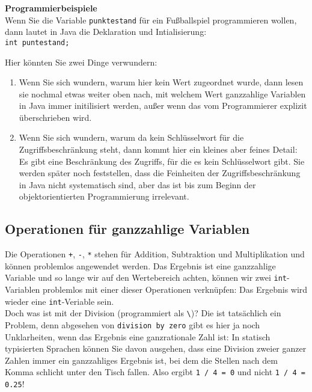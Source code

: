 \textbf{Programmierbeispiele}\\

Wenn Sie die Variable \verb|punktestand| für ein Fußballspiel programmieren wollen, dann lautet in Java die Deklaration und Intialisierung:\\

\verb|int puntestand;|

Hier könnten Sie zwei Dinge verwundern:

\begin{enumerate}
	\item Wenn Sie sich wundern, warum hier kein Wert zugeordnet wurde, dann lesen sie nochmal etwas weiter oben nach, mit welchem Wert ganzzahlige Variablen in Java immer initilisiert werden, außer wenn das vom Programmierer explizit überschrieben wird.
	\item Wenn Sie sich wundern, warum da kein Schlüsselwort für die Zugriffsbeschränkung steht, dann kommt hier ein kleines aber feines Detail: Es gibt eine Beschränkung des Zugriffs, für die es kein Schlüsselwort gibt. Sie werden später noch feststellen, dass die Feinheiten der Zugriffsbeschränkung in Java nicht systematisch sind, aber das ist bis zum Beginn der objektorientierten Programmierung irrelevant.
\end{enumerate}

\subsection{Operationen für ganzzahlige Variablen}

Die Operationen \verb|+|, \verb|-|, \verb|*| stehen für Addition, Subtraktion und Multiplikation und können problemlos angewendet werden. Das Ergebnis ist eine ganzzahlige Variable und so lange wir auf den Wertebereich achten, können wir zwei \verb|int|-Variablen problemlos mit einer dieser Operationen verknüpfen: Das Ergebnis wird wieder eine \verb|int|-Veriable sein.\\

Doch was ist mit der Division (programmiert als \verb|\|)? Die ist tatsächlich ein Problem, denn abgesehen von \verb|division by zero| gibt es hier ja noch Unklarheiten, wenn das Ergebnis eine ganzrationale Zahl ist: In statisch typisierten Sprachen können Sie davon ausgehen, dass eine Division zweier ganzer Zahlen immer ein ganzzahliges Ergebnis ist, bei dem die Stellen nach dem Komma schlicht unter den Tisch fallen. Also ergibt \verb|1 / 4 = 0| und nicht \verb|1 / 4 = 0.25|!\\

